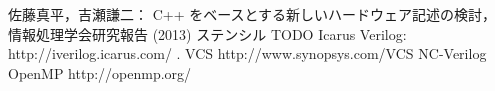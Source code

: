 \begin{thebibliography}{99}
   佐藤真平，吉瀬謙二：
   C++ をベースとする新しいハードウェア記述の検討，
   情報処理学会研究報告 (2013)
   ステンシル TODO
   Icarus Verilog: http://iverilog.icarus.com/ .
   VCS http://www.synopsys.com/VCS
   NC-Verilog
   OpenMP http://openmp.org/
\end{thebibliography}
